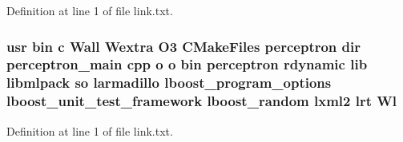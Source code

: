 Definition at line 1 of file link.\-txt.

\subsubsection[{Wl}]{\setlength{\rightskip}{0pt plus 5cm}usr bin c Wall Wextra O3 C\-Make\-Files perceptron dir perceptron\-\_\-main cpp o o bin perceptron rdynamic lib libmlpack so larmadillo lboost\-\_\-program\-\_\-options lboost\-\_\-unit\-\_\-test\-\_\-framework lboost\-\_\-random lxml2 lrt Wl}\label{methods_2perceptron_2CMakeFiles_2perceptron_8dir_2link_8txt_ac5467c3bf0e5a8d63ca90729ee534362}


Definition at line 1 of file link.\-txt.

